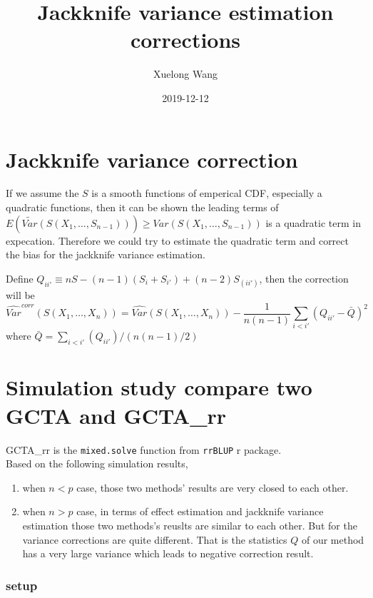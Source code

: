 \documentclass[]{article}
\title{Jackknife variance estimation corrections}
\author{Xuelong Wang}
\date{2019-12-12}
\providecommand{\tightlist}{%
  \setlength{\itemsep}{0pt}\setlength{\parskip}{0pt}}
\begin{document}
\maketitle

{
\setcounter{tocdepth}{2}
\tableofcontents
}
\section{Jackknife variance
correction}\label{jackknife-variance-correction}

If we assume the \(S\) is a smooth functions of emperical CDF,
especially a quadratic functions, then it can be shown the leading terms
of
\(E(\tilde{Var}(S(X_1, \dots, S_{n-1}))) \geq Var(S(X_1, \dots, S_{n-1}))\)
is a quadratic term in expecation. Therefore we could try to estimate
the quadratic term and correct the bias for the jackknife variance
estimation.

Define \(Q_{ii'} \equiv nS - (n-1)(S_{i} + S_{i'}) + (n-2)S_{(ii')}\),
then the correction will be \[
\hat{Var}^{corr}(S(X_1, \dots, X_n)) = \hat{Var}(S(X_1, \dots, X_n)) - \frac{1}{n(n-1)}\sum_{i < i'}(Q_{ii'}- \bar{Q})^2
\] where \(\bar{Q} = \sum_{i < i'}(Q_{ii'})/(n(n-1)/2)\)

\section{Simulation study compare two GCTA and
GCTA\_rr}\label{simulation-study-compare-two-gcta-and-gcta_rr}

GCTA\_rr is the \texttt{mixed.solve} function from \texttt{rrBLUP} r
package.\\
Based on the following simulation results,

\begin{enumerate}
\def\labelenumi{\arabic{enumi}.}
\tightlist
\item
  when \(n<p\) case, those two methods' results are very closed to each
  other.
\item
  when \(n>p\) case, in terms of effect estimation and jackknife
  variance estimation those two methods's reuslts are similar to each
  other. But for the variance corrections are quite different. That is
  the statistics \(Q\) of our method has a very large variance which
  leads to negative correction result.
\end{enumerate}

\subsubsection{setup}\label{setup}
\end{document}
